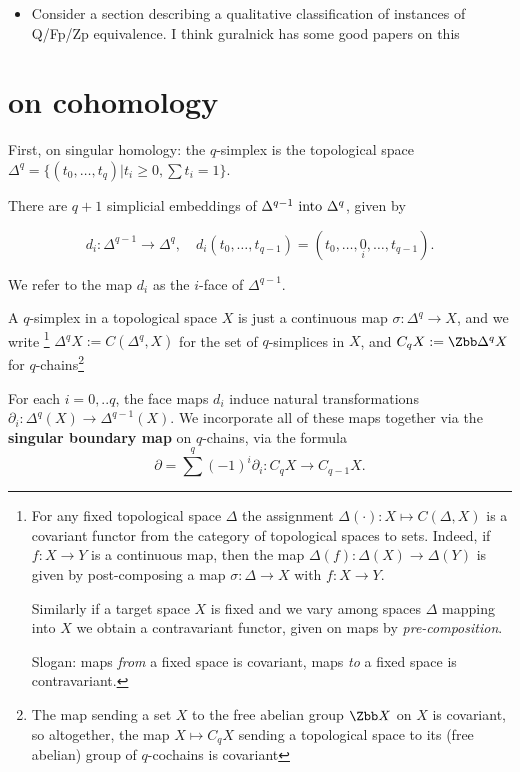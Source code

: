 \begin{itemize}
  \item Consider a section describing a qualitative classification of instances of Q/Fp/Zp equivalence. I think guralnick has some good papers on this
\end{itemize}

\section{on cohomology}
First, on singular homology: the $q$-simplex is the topological space $\Delta^q = \{(t_0,\dots,t_q) | t_i\geq 0, \sum t_i =1 \}$.

There are \(q+1\) simplicial embeddings of \( \Delta^{q-1}$ into $\Delta^q \), given by

\[d_i : \Delta^{q-1} \to \Delta^{q},\quad d_i(t_0,\dots,t_{q-1}) =\left(t_0, \ldots, \underset{i}{0}, \ldots, t_{q-1}\right). \]

We refer to the map $d_i$ as the $i$-face of $\Delta^{q-1}$.

A $q$-simplex in a topological space $X$ is just a continuous map $\sigma: \Delta^q \to X$, and we write
\footnote{For any fixed topological space $\Delta$ the assignment $\Delta(\cdot):X \mapsto C(\Delta , X)$ is a covariant functor from the category of topological spaces to sets. Indeed, if $f:X \to Y$ is a continuous map, then the map $\Delta(f): \Delta(X) \to \Delta(Y)$ is given by post-composing a map $\sigma :\Delta \to X$ with $f:X\to Y$.

  Similarly if a target space $X$ is fixed and we vary among spaces $\Delta$ mapping into $X$ we obtain a contravariant functor, given on maps by \emph{pre-composition}.

  Slogan: maps \emph{from} a fixed space is covariant, maps \emph{to} a fixed space is contravariant.}
$\Delta^q X:=C(\Delta^q,X)$ for the set of $q$-simplices in $X$, and $C_q X :=\Zbb \Delta^q X$ for $q$-chains\footnote{The map sending a set $X$ to the free abelian group $\Zbb X$ on $X$ is covariant, so altogether, the map $X \mapsto C_q X$ sending a topological space to its (free abelian) group of $q$-cochains is covariant}



For each $i=0,..q$, the face maps $d_i$ induce natural transformations $\partial_i : \Delta^{q}(X)\to \Delta^{q-1}(X)$. We incorporate all of these maps together via the \textbf{singular boundary map} on $q$-chains, via the formula
\[\partial=\sum^q(-1)^i \partial_i: C_q X \rightarrow C_{q-1} X.\]

